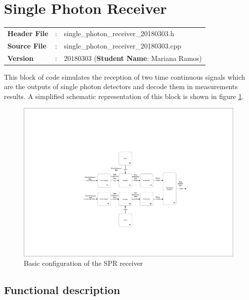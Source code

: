 \clearpage

\section{Single Photon Receiver}

\begin{tcolorbox}	
\begin{tabular}{p{2.75cm} p{0.2cm} p{10.5cm}} 	
\textbf{Header File}   &:& single\_photon\_receiver\_20180303.h \\
\textbf{Source File}   &:& single\_photon\_receiver\_20180303.cpp \\
\textbf{Version}       &:& 20180303 (\textbf{Student Name}: Mariana Ramos)
\end{tabular}
\end{tcolorbox}

This block of code simulates the reception of two time continuous signals which are the outputs of single photon detectors and decode them in measurements results. A simplified schematic representation of this block is shown in figure \ref{SPR_receiver_block_diagram_simple}.

\begin{figure}[h]
	\centering
	\includegraphics[clip, trim=8cm 4cm 6cm 5cm, width=1.00\textwidth]{../lib/single_photon_receiver/figures/single_photon_receiver.pdf}
	\caption{Basic configuration of the SPR receiver}\label{SPR_receiver_block_diagram_simple}
\end{figure}

\subsection*{Functional description}

